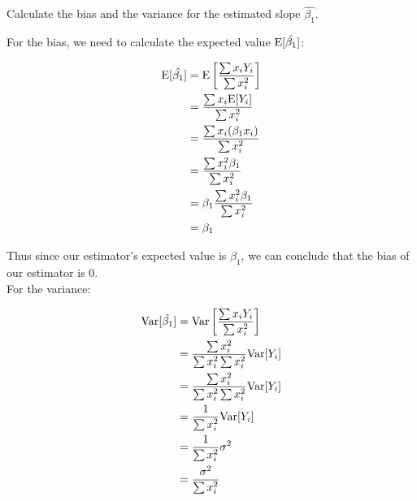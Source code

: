 \begin{homeworkProblem}
  Calculate the bias and the variance for the estimated slope
  \(\hat{\beta_1}\).
  \\

  \solution

  For the bias, we need to calculate the expected value
  \(\mathrm{E}[\hat{\beta_1}]\):

  \[
      \begin{split}
          \mathrm{E}[\hat{\beta_1}]
          &= \mathrm{E} \left[ \frac{
              \sum {x_i Y_i}
          }{
              \sum x_i^2
          }\right]
          \\
          &= \frac{
              \sum {x_i \mathrm{E}[Y_i]}
          }{
              \sum x_i^2
          }
          \\
          &= \frac{
              \sum {x_i (\beta_1 x_i)}
          }{
              \sum x_i^2
          }
          \\
          &= \frac{
              \sum {x_i^2 \beta_1}
          }{
              \sum x_i^2
          }
          \\
          &= \beta_1 \frac{
              \sum {x_i^2 \beta_1}
          }{
              \sum x_i^2
          }
          \\
          &= \beta_1
      \end{split}
  \]

  Thus since our estimator's expected value is \(\beta_1\), we can conclude
  that the bias of our estimator is 0.
  \\

  For the variance:

  \[
      \begin{split}
          \mathrm{Var}[\hat{\beta_1}]
          &= \mathrm{Var} \left[ \frac{
              \sum {x_i Y_i}
          }{
              \sum x_i^2
          }\right]
          \\
          &=
          \frac{
              \sum {x_i^2}
          }{
              \sum x_i^2 \sum x_i^2
          } \mathrm{Var}[Y_i]
          \\
          &=
          \frac{
              \sum {x_i^2}
          }{
              \sum x_i^2 \sum x_i^2
          } \mathrm{Var}[Y_i]
          \\
          &=
          \frac{
              1
          }{
              \sum x_i^2
          } \mathrm{Var}[Y_i]
          \\
          &=
          \frac{
              1
          }{
              \sum x_i^2
          } \sigma^2
          \\
          &=
          \frac{
              \sigma^2
          }{
              \sum x_i^2
          }
      \end{split}
  \]

\end{homeworkProblem}